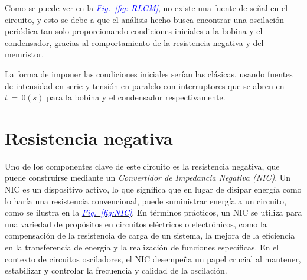 \documentclass[12pt,a4paper]{report} %
\newcommand{\fref}[1]{\hyperref[#1]{\textcolor{blue}{\textit{Fig.~\ref*{#1}}}}}
\begin{document}
	\vspace{0.5cm}Como se puede ver en la \fref{fig:-RLCM}, no existe una fuente de señal en el circuito, y esto se debe a que el análisis hecho busca encontrar una oscilación periódica tan solo proporcionando condiciones iniciales a la bobina y el condensador, gracias al comportamiento de la resistencia negativa y del memristor.
	
	\vspace{0.5cm}La forma de imponer las condiciones iniciales serían las clásicas, usando fuentes de intensidad en serie y tensión en paralelo con interruptores que se abren en \\$t\,=\,0(s)$ para la bobina y el condensador respectivamente.
	
	\newpage
	\section{Resistencia negativa}
	
	\noindent Uno de los componentes clave de este circuito es la resistencia negativa, que puede construirse mediante un \emph{Convertidor de Impedancia Negativa (NIC)}. Un NIC es un dispositivo activo, lo que significa que en lugar de disipar energía como lo haría una resistencia convencional, puede suministrar energía a un circuito, como se ilustra en la \fref{fig:NIC}. En términos prácticos, un NIC se utiliza para una variedad de propósitos en circuitos eléctricos o electrónicos, como la compensación de la resistencia de carga de un sistema, la mejora de la eficiencia en la transferencia de energía y la realización de funciones específicas.
	En el contexto de circuitos osciladores, el NIC desempeña un papel crucial al mantener, estabilizar y controlar la frecuencia y calidad de la oscilación.
	 
\end{document}
